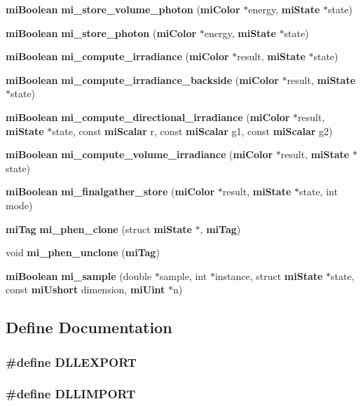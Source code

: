 \begin{CompactItemize}
\item 
{\bf mi\-Boolean} {\bf mi\_\-store\_\-volume\_\-photon} ({\bf mi\-Color} $\ast$energy, {\bf mi\-State} $\ast$state)
\item 
{\bf mi\-Boolean} {\bf mi\_\-store\_\-photon} ({\bf mi\-Color} $\ast$energy, {\bf mi\-State} $\ast$state)
\item 
{\bf mi\-Boolean} {\bf mi\_\-compute\_\-irradiance} ({\bf mi\-Color} $\ast$result, {\bf mi\-State} $\ast$state)
\item 
{\bf mi\-Boolean} {\bf mi\_\-compute\_\-irradiance\_\-backside} ({\bf mi\-Color} $\ast$result, {\bf mi\-State} $\ast$state)
\item 
{\bf mi\-Boolean} {\bf mi\_\-compute\_\-directional\_\-irradiance} ({\bf mi\-Color} $\ast$result, {\bf mi\-State} $\ast$state, const {\bf mi\-Scalar} r, const {\bf mi\-Scalar} g1, const {\bf mi\-Scalar} g2)
\item 
{\bf mi\-Boolean} {\bf mi\_\-compute\_\-volume\_\-irradiance} ({\bf mi\-Color} $\ast$result, {\bf mi\-State} $\ast$state)
\item 
{\bf mi\-Boolean} {\bf mi\_\-finalgather\_\-store} ({\bf mi\-Color} $\ast$result, {\bf mi\-State} $\ast$state, int mode)
\item 
{\bf mi\-Tag} {\bf mi\_\-phen\_\-clone} (struct {\bf mi\-State} $\ast$, {\bf mi\-Tag})
\item 
void {\bf mi\_\-phen\_\-unclone} ({\bf mi\-Tag})
\item 
{\bf mi\-Boolean} {\bf mi\_\-sample} (double $\ast$sample, int $\ast$instance, struct {\bf mi\-State} $\ast$state, const {\bf mi\-Ushort} dimension, {\bf mi\-Uint} $\ast$n)
\end{CompactItemize}


\subsection{Define Documentation}
\subsubsection{\setlength{\rightskip}{0pt plus 5cm}\#define DLLEXPORT}\label{shader_8h_a17}


\subsubsection{\setlength{\rightskip}{0pt plus 5cm}\#define DLLIMPORT}\label{shader_8h_a16}


